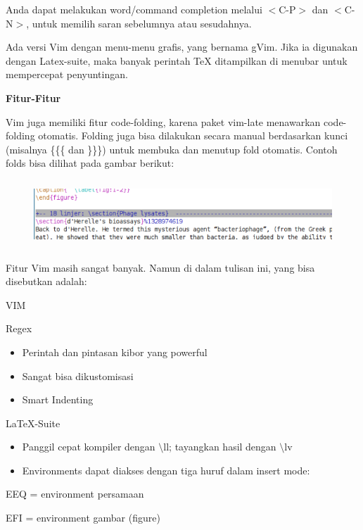 \documentclass[12pt,a4paper]{article}
\begin{document}
\begin{enumerate}
Anda dapat melakukan word/command completion melalui $<$C-P$>$ dan $<$C-N$>$, untuk memilih saran sebelumnya atau sesudahnya.
\par \vspace{12pt}
Ada versi Vim dengan menu-menu grafis, yang bernama gVim. Jika ia digunakan dengan Latex-suite, maka banyak perintah TeX ditampilkan di menubar untuk mempercepat penyuntingan.
\par \vspace{12pt}
\textbf{Fitur-Fitur}
\par \vspace{12pt}
Vim juga memiliki fitur code-folding, karena paket vim-late menawarkan code-folding otomatis. Folding juga bisa dilakukan secara manual berdasarkan kunci (misalnya \{\{\{ dan \}\}\}) untuk membuka dan menutup fold otomatis. Contoh folds bisa dilihat pada gambar berikut:

\begin{figure}[ht]
\centering
\includegraphics[width=15.12cm,height=2.54cm]{gambar/image5.jpg}
\end{figure}

Fitur Vim masih sangat banyak. Namun di dalam tulisan ini, yang bisa disebutkan adalah:

VIM

Regex

\begin{itemize}
\item Perintah dan pintasan kibor yang powerful
\item Sangat bisa dikustomisasi
\item Smart Indenting
\end{itemize}
LaTeX-Suite

\begin{itemize}
\item Panggil cepat kompiler dengan $\setminus$ll; tayangkan hasil dengan $\setminus$lv
\item Environments dapat diakses dengan tiga huruf dalam insert mode:
\end{itemize}
\hspace{0,2in}EEQ = environment persamaan

EFI = environment gambar (figure)


\end{enumerate}
\end{document}
